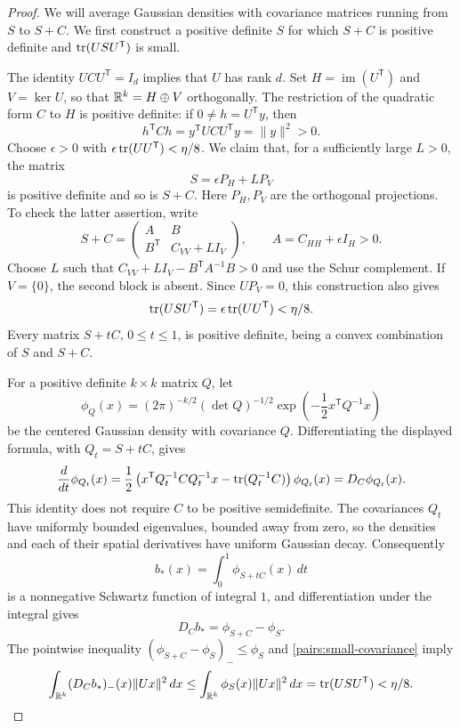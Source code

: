 \begin{proof}
We will average Gaussian densities with covariance matrices running from
$S$ to $S+C$. We first construct a positive definite $S$ for which
$S+C$ is positive definite and $\operatorname{tr}(USU^{\mathsf T})$ is small.

The identity $UCU^{\mathsf T}=I_d$ implies that $U$ has rank $d$.
Set $H=\operatorname{im}(U^{\mathsf T})$ and $V=\ker U$, so that
$\mathbb R^k=H\oplus V$ orthogonally. The restriction of the quadratic form
$C$ to $H$ is positive definite: if $0\ne h=U^{\mathsf T}y$, then
\[
 h^{\mathsf T}Ch=y^{\mathsf T}UCU^{\mathsf T}y=\|y\|^2>0.
\]
Choose $\epsilon>0$ with
$\epsilon\operatorname{tr}(UU^{\mathsf T})<\eta/8$. We claim that, for a sufficiently
large $L>0$, the matrix
\[
 S=\epsilon P_H+L P_V
\]
is positive definite and so is $S+C$. Here $P_H,P_V$ are the orthogonal
projections. To check the latter assertion, write
\[
 S+C=
 \begin{pmatrix}
  A&B\\ B^{\mathsf T}&C_{VV}+L I_V
 \end{pmatrix},
 \qquad A=C_{HH}+\epsilon I_H>0.
\]
Choose $L$ such that
$C_{VV}+L I_V-B^{\mathsf T}A^{-1}B>0$ and use the Schur complement.
If $V=\{0\}$, the second block is absent. Since $UP_V=0$, this construction
also gives
\begin{equation}\label{pairs:small-covariance}
 \operatorname{tr}(USU^{\mathsf T})=\epsilon\operatorname{tr}(UU^{\mathsf T})<\eta/8.
\end{equation}
Every matrix $S+tC$, $0\leq t\leq1$, is positive definite, being a convex
combination of $S$ and $S+C$.

For a positive definite $k\times k$ matrix $Q$, let
\[
 \phi_Q(x)=(2\pi)^{-k/2}(\det Q)^{-1/2}
                 \exp\!\left(-\frac12x^{\mathsf T}Q^{-1}x\right)
\]
be the centered Gaussian density with covariance $Q$. Differentiating
the displayed formula, with $Q_t=S+tC$, gives
\[
 \frac{d}{dt}\phi_{Q_t}(x)
 =\frac12\left(
    x^{\mathsf T}Q_t^{-1}CQ_t^{-1}x-\operatorname{tr}(Q_t^{-1}C)
   \right)\phi_{Q_t}(x)
 =D_C\phi_{Q_t}(x).
\]
This identity does not require $C$ to be positive semidefinite. The
covariances $Q_t$ have uniformly bounded eigenvalues, bounded away from
zero, so the densities and each of their spatial derivatives have
uniform Gaussian decay. Consequently
\[
 b_*(x)=\int_0^1\phi_{S+tC}(x)\,dt
\]
is a nonnegative Schwartz function of integral $1$, and differentiation
under the integral gives
\[
 D_Cb_* = \phi_{S+C}-\phi_S.
\]
The pointwise inequality $(\phi_{S+C}-\phi_S)_-\leq\phi_S$ and
\eqref{pairs:small-covariance} imply
\begin{equation}\label{pairs:gaussian-bound}
 \int_{\mathbb R^k}(D_Cb_*)_-(x)\|Ux\|^2\,dx
 \leq\int_{\mathbb R^k}\phi_S(x)\|Ux\|^2\,dx
 =\operatorname{tr}(USU^{\mathsf T})<\eta/8.
\end{equation}


\end{proof}
